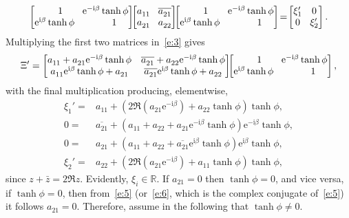 \documentclass[a4paper,12pt,twoside]{article}
\begin{document}
\begin{equation}
  \begin{bmatrix}
  \hphantom{\mathrm{e}^{\mathrm{i}\beta}}1 & \!\mathrm{e}^{-\mathrm{i}\beta}\tanh\phi\\
  \mathrm{e}^{\mathrm{i}\beta}\tanh\phi & \!\hphantom{\mathrm{e}^{-\mathrm{i}\beta}}1
  \end{bmatrix}\!\!\begin{bmatrix}
  a_{11}^{} & \!\overline{a_{21}^{}}\\
  a_{21}^{} & \!a_{22}^{}
  \end{bmatrix}\!\!\begin{bmatrix}
  \hphantom{\mathrm{e}^{\mathrm{i}\beta}}1 & \!\mathrm{e}^{-\mathrm{i}\beta}\tanh\phi\\
  \mathrm{e}^{\mathrm{i}\beta}\tanh\phi & \!\hphantom{\mathrm{e}^{-\mathrm{i}\beta}}1
  \end{bmatrix}\!=\!\begin{bmatrix}
  \xi_1' & \!0\\
  0 & \!\xi_2'
  \end{bmatrix}.
  \label{e:3}
\end{equation}
Multiplying the first two matrices in~\eqref{e:3} gives
\begin{displaymath}
  \Xi'=\begin{bmatrix}
  a_{11}^{}+a_{21}^{}\mathrm{e}^{-\mathrm{i}\beta}\tanh\phi & \overline{a_{21}^{}}+a_{22}^{}\mathrm{e}^{-\mathrm{i}\beta}\tanh\phi\\
  a_{11}^{}\mathrm{e}^{\mathrm{i}\beta}\tanh\phi+a_{21}^{} & \overline{a_{21}^{}}\mathrm{e}^{\mathrm{i}\beta}\tanh\phi+a_{22}^{}
  \end{bmatrix}\!\!\begin{bmatrix}
  \hphantom{\mathrm{e}^{\mathrm{i}\beta}}1 & \!\mathrm{e}^{-\mathrm{i}\beta}\tanh\phi\\
  \mathrm{e}^{\mathrm{i}\beta}\tanh\phi & \!\hphantom{\mathrm{e}^{-\mathrm{i}\beta}}1
  \end{bmatrix},
\end{displaymath}
with the final multiplication producing, elementwise,
\begin{eqnarray}
    \xi_1'=&a_{11}^{}+(2\Re(a_{21}^{}\mathrm{e}^{-\mathrm{i}\beta})+a_{22}^{}\tanh\phi)\tanh\phi,\label{e:4}\\
    0=&\overline{a_{21}^{}}+(a_{11}^{}+a_{22}^{}+a_{21}^{}\mathrm{e}^{-\mathrm{i}\beta}\tanh\phi)\mathrm{e}^{-\mathrm{i}\beta}\tanh\phi,\label{e:5}\\
    0=&a_{21}^{}+(a_{11}^{}+a_{22}^{}+\overline{a_{21}^{}}\mathrm{e}^{\mathrm{i}\beta}\tanh\phi)\mathrm{e}^{\mathrm{i}\beta}\tanh\phi,\label{e:6}\\
    \xi_2'=&a_{22}^{}+(2\Re(a_{21}^{}\mathrm{e}^{-\mathrm{i}\beta})+a_{11}^{}\tanh\phi)\tanh\phi,\label{e:7}
\end{eqnarray}
since $z+\bar{z}=2\Re{z}$.  Evidently, $\xi_i\in\mathbb{R}$.  If
$a_{21}=0$ then $\tanh\phi=0$, and vice versa, if $\tanh\phi=0$, then
from~\eqref{e:5} (or~\eqref{e:6}, which is the complex conjugate
of~\eqref{e:5}) it follows $a_{21}=0$.  Therefore, assume in the
following that $\tanh\phi\ne 0$.
\end{document}
